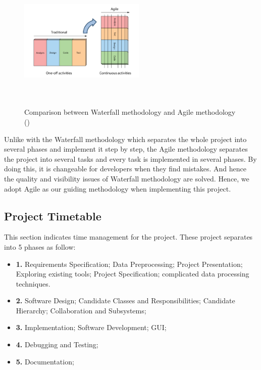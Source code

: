 \begin{figure}[h]
	\centering	
	\includegraphics[width=6cm, height=6cm]{Figs/Waterfull-Agile}\\[1ex]
	\caption{Comparison between Waterfall methodology and Agile methodology (\cite{Agile vs Waterfall})}
	\label{fig:waterfallAgile}
\end{figure}

Unlike with the Waterfall methodology which separates the whole project into several phases and implement it step by step, the Agile methodology separates the project into several tasks and every task is implemented in several phases. By doing this, it is changeable for developers when they find mistakes. And hence the quality and visibility issues of Waterfall methodology are solved. Hence, we adopt Agile as our guiding methodology when implementing this project.

\subsection{Project Timetable}

This section indicates time management for the project. These project separates into 5 phases \cite{Laramee} as follow:

\begin{itemize}
	\item \textbf{1. }Requirements Specification; 
	Data Preprocessing; 
	Project Presentation;
	Exploring existing tools; 
	Project Specification; 
	 complicated data processing techniques.
	\item \textbf{2. }Software Design;
	Candidate Classes and Responsibilities;
	Candidate Hierarchy;
	Collaboration and Subsystems;
	\item \textbf{3. }Implementation;
	Software Development;
	GUI;
	\item \textbf{4. }Debugging and Testing;
	\item \textbf{5. }Documentation;
\end{itemize}

